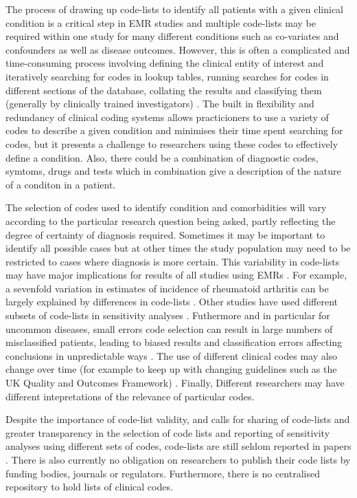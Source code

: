 \documentclass[10pt]{article}
\begin{document}
The process of drawing up code-lists to identify all patients with a given clinical condition is a critical step in EMR studies and multiple code-lists may be required within one study for many different conditions such as co-variates and confounders as well as disease outcomes.  However, this is often a complicated and time-consuming process involving defining the clinical entity of interest and iteratively searching for codes in lookup tables, running searches for codes in different sections of the database, collating the results and classifying them (generally by clinically trained investigators) \cite{Nicholson2013}.  The built in flexibility and redundancy of clinical coding systems allows practicioners to use a variety of codes to describe a given condition and minimises their time spent searching for codes, but it presents a challenge to researchers using these codes to effectively define a condition.  Also, there could be a combination of diagnostic codes, symtoms, drugs and tests which in combination give a description of the nature of a conditon in a patient. 


The selection of codes used to identify condition and comorbidities will vary according to the particular research question being asked, partly reflecting the degree of certainty of diagnosis required. Sometimes it may be important to identify all possible cases but at other times the study population may need to be restricted to cases where diagnosis is more certain. This variability in code-lists may have major implications for results of all studies using EMRs \cite{Nicholson2011}. For example, a sevenfold variation in estimates of incidence of rheumatoid arthritis can be largely explained by differences in code-lists \cite{Garcia2009, Watson2003}.  Other studies have used different subsets of code-lists in sensitivity analyses \cite{Doran2011, Herrett2010}.  Futhermore and in particular for uncommon diseases, small errors code selection can result in large numbers of misclassified patients, leading to biased results and classification errors affecting conclusions in unpredictable ways \cite{Manuel2010}. The use of different clinical codes may also change over time (for example to keep up with changing guidelines such as the UK Quality and Outcomes Framework) \cite{Gulliford2009}.  Finally, Different researchers may have different intepretations of the relevance of particular codes.

Despite the importance of code-list validity, and calls for sharing of code-lists and greater transparency in the selection of code lists and reporting of sensitivity analyses using different sets of codes\cite{Gulliford2009, Bhattarai2012}, code-lists are still seldom reported in papers \cite{Herrett2010}.  There is also currently no obligation on researchers to publish their code lists by funding bodies, journals or regulators.  Furthermore, there is no centralised repository to hold lists of clinical codes.
\end{document}
